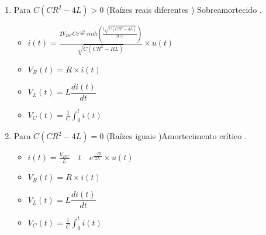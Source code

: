 \begin{enumerate}
\item
Para \quad $C(C R^2-4 L)>0$ \quad (Ra\'{i}zes  reais  diferentes ) \quad Sobreamortecido .\par
%
\begin{itemize}
\item
$i(t)=\frac{2 V_{DC} C e^{\frac{-tR}{2L}} sinh \left( \frac{t \sqrt{C(CR^2-4L)}}{2CL} \right)}{\sqrt{C(CR^2-RL)}}\times u(t)$\par
\item
$V_R(t)=R\times i(t)$\par
\item
$V_L(t)=L\dfrac{di(t)}{dt}$\par
%
\begin{minipage}{0.95\linewidth}
\end{minipage}\par
%
\item
$V_C(t)=\frac{1}{C}\int_0^ti(t)$\par
%
\begin{minipage}{0.95\linewidth}
\end{minipage}\par
%
\end{itemize}
\item
Para \quad $C(C R^2-4 L)=0$ \quad (Ra\'{i}zes  iguais )\quad Amortecimento  cr\'{i}tico .\par
%
\begin{itemize}
\item
$i(t)=\frac{V_{DC}}{L} \quad  t \quad e^{\frac{-R t}{2L}} \times u(t)$\par
\item
$V_R(t)=R\times i(t)$\par
\item
$V_L(t)=L\dfrac{di(t)}{dt}$\par
%
\begin{minipage}{0.95\linewidth}
\end{minipage}\par
%
\item
$V_C(t)=\frac{1}{C}\int_0^ti(t)$\par
\begin{minipage}{0.95\linewidth}

\end{minipage}
\end{itemize}
\end{enumerate}
